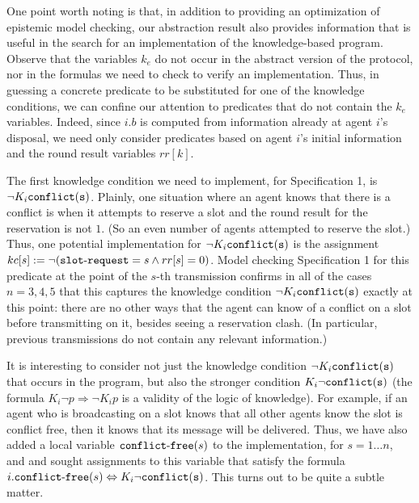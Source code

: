 \documentclass[]{llncs}
\newcommand{\conflictfree}{{\tt conflict\mbox{-}free}}
\newcommand{\rimp}{\Rightarrow}
\newcommand{\dimp}{\Leftrightarrow}
\newcommand{\slotrequest}{{\tt slot\mbox{-}request}}
\newcommand{\conflict}{\tt conflict}
\begin{document}
One point worth noting is that, in addition to providing an optimization of 
epistemic model checking, our abstraction result also provides information that is useful in 
the search for an implementation of the knowledge-based program. Observe that the 
variables  $k_e$ do not occur in the abstract version of the protocol, 
nor in the formulas we need to check to verify an implementation. 
Thus, in guessing a concrete predicate to be substituted for one of the 
knowledge conditions, we can confine our attention to predicates that 
do not contain the $k_e$ variables. Indeed, since $i.b$ is computed from 
information already at agent $i$'s disposal, we need only consider 
predicates based on agent $i$'s initial information and the round result
variables $rr[k]$. 

The first knowledge condition we need to implement, for Specification 1, 
is  $\neg K_i \conflict(s)$. Plainly, one situation 
where an agent knows that there is a conflict is when it 
attempts to reserve a slot and the round result for the reservation 
is not $1$. (So an even number of agents attempted to reserve the slot.) 
Thus, one potential implementation for  $\neg K_i \conflict(s)$ is the assignment 
 $kc[s] := \neg (\slotrequest =s \land rr[s] = 0)$. Model checking Specification 1 for this 
predicate at the point of the $s$-th transmission  confirms 
in all of the cases $n=3,4,5$ that this captures the knowledge condition 
$\neg K_i \conflict(s)$ exactly at this  point: there are no other ways 
that the agent can know of a conflict on a slot before transmitting on it, 
besides seeing a reservation clash. 
(In particular, previous transmissions do not contain any relevant information.)   

It is interesting to consider not just the knowledge condition 
$\neg K_i \conflict(s)$ that occurs in the program, but also the 
stronger condition $K_i \neg \conflict(s)$ (the formula $K_i \neg p \rimp \neg K_i p$ is a 
validity of the logic of knowledge). For example, if an agent who is broadcasting 
on a slot knows that all other agents know the slot is conflict free, then 
it knows that its message will be delivered. Thus, we have also added a local variable 
$\conflictfree(s)$ to the implementation, for $s= 1\ldots n$,  and 
and sought assignments to this variable that satisfy the formula 
$i.\conflictfree(s) \dimp K_i \neg \conflict(s)$. This turns out to be 
quite a subtle matter. 
\end{document}
